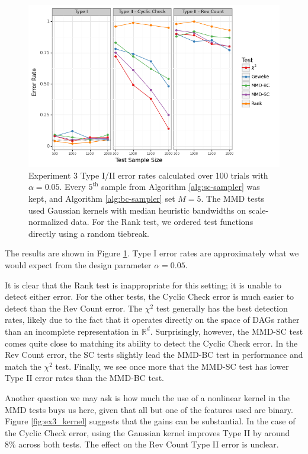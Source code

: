 \documentclass[a4paper,12pt]{article}
\begin{document}
\begin{figure}
    \centering
    \includegraphics[width=\textwidth]{figures/graph_comparison.png}
    \caption{Experiment 3 Type I/II error rates calculated over 100 trials with $\alpha=0.05$. Every $5^{\text{th}}$ sample from Algorithm \ref{alg:sc-sampler} was kept, and Algorithm \ref{alg:bc-sampler} set $M=5$. The MMD tests used Gaussian kernels with median heuristic bandwidths on scale-normalized data. For the Rank test, we ordered test functions directly using a random tiebreak.}
    \label{fig:ex3_comparison}
\end{figure}

The results are shown in Figure \ref{fig:ex3_comparison}. Type I error rates are approximately what we would expect from the design parameter $\alpha=0.05$.

It is clear that the Rank test is inappropriate for this setting; it is unable to detect either error. For the other tests, the Cyclic Check error is much easier to detect than the Rev Count error. The $\chi^{2}$ test generally has the best detection rates, likely due to the fact that it operates directly on the space of DAGs rather than an incomplete representation in $\mathbb{R}^{d}$. Surprisingly, however, the MMD-SC test comes quite close to matching its ability to detect the Cyclic Check error. In the Rev Count error, the SC tests slightly lead the MMD-BC test in performance and match the $\chi^{2}$ test. Finally, we see once more that the MMD-SC test has lower Type II error rates than the MMD-BC test.

Another question we may ask is how much the use of a nonlinear kernel in the MMD tests buys us here, given that all but one of the features used are binary. Figure \ref{fig:ex3_kernel} suggests that the gains can be substantial. In the case of the Cyclic Check error, using the Gaussian kernel improves Type II by around 8\% across both tests. The effect on the Rev Count Type II error is unclear.
\end{document}
